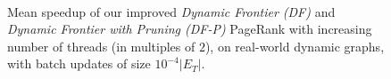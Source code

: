 \begin{figure}[!hbt]
  \centering
   \\[-2ex]
  \caption{Mean speedup of our improved \textit{Dynamic Frontier (DF)} and \textit{Dynamic Frontier with Pruning (DF-P)} PageRank with increasing number of threads (in multiples of $2$), on real-world dynamic graphs, with batch updates of size $10^{-4}|E_T|$.}
  \label{fig:strong-scaling}
\end{figure}

